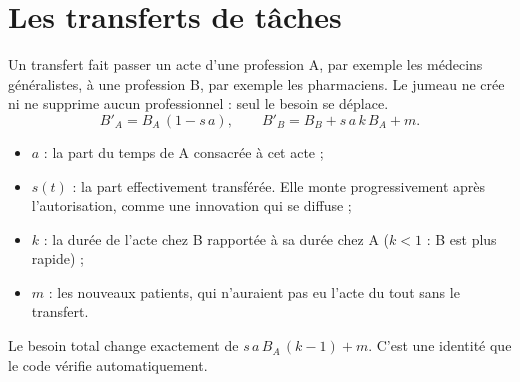 \documentclass[11pt]{article}
\begin{document}
\section{Les transferts de tâches}
Un transfert fait passer un acte d'une profession A, par exemple les médecins généralistes, à une profession B,
par exemple les pharmaciens. Le jumeau ne crée ni ne supprime aucun professionnel : seul le besoin se déplace.
\[
B'_A = B_A\,(1 - s\,a), \qquad
B'_B = B_B + s\,a\,k\,B_A + m .
\]
\begin{itemize}
  \item $a$ : la part du temps de A consacrée à cet acte ;
  \item $s(t)$ : la part effectivement transférée. Elle monte progressivement après l'autorisation, comme une
    innovation qui se diffuse ;
  \item $k$ : la durée de l'acte chez B rapportée à sa durée chez A ($k<1$ : B est plus rapide) ;
  \item $m$ : les nouveaux patients, qui n'auraient pas eu l'acte du tout sans le transfert.
\end{itemize}
Le besoin total change exactement de $s\,a\,B_A\,(k-1)+m$. C'est une identité que le code vérifie automatiquement.
\end{document}
